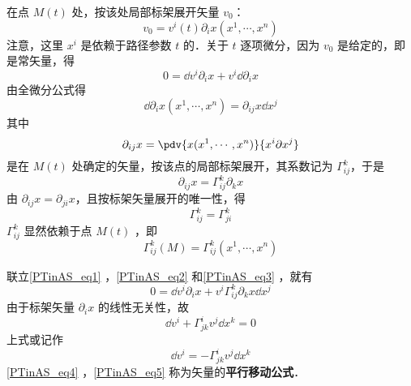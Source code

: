 在点 $M(t)$ 处，按该处局部标架展开矢量 $v_0$：
\begin{equation}
v_0=v^i(t)\partial_i x(x^1,\cdots,x^n)
\end{equation}
注意，这里 $x^i$ 是依赖于路径参数 $t$ 的．关于 $t$ 逐项微分，因为 $v_0$ 是给定的，即是常矢量，得
\begin{equation}\label{PTinAS_eq1}
0=\dd v^i\partial_i x+v^i\dd \partial_i x
\end{equation}
由全微分公式得
\begin{equation}\label{PTinAS_eq2}
\dd \partial_i x(x^1,\cdots,x^n)=\partial_{ij}x\dd x^j
\end{equation}
其中
\begin{equation}
\partial_{ij}x=\pdv{x(x^1,\cdots,x^n)}{x^i\partial x^j}
\end{equation}
是在 $M(t)$ 处确定的矢量，按该点的局部标架展开，其系数记为 $\Gamma^k_{ij}$，于是
\begin{equation}\label{PTinAS_eq3}
\partial_{ij}x=\Gamma^k_{ij}\partial_k x
\end{equation}
由 $\partial_{ij} x=\partial_{ji} x$，且按标架矢量展开的唯一性，得
\begin{equation}
\Gamma^k_{ij}=\Gamma^k_{ji}
\end{equation}
 $\Gamma^k_{ij}$ 显然依赖于点 $M(t)$ ，即
 \begin{equation}
 \Gamma^k_{ij}(M)=\Gamma^k_{ij}(x^1,\cdots,x^n)
 \end{equation}
 
联立\autoref{PTinAS_eq1} ，\autoref{PTinAS_eq2} 和\autoref{PTinAS_eq3} ，就有
\begin{equation}
0=\dd v^i\partial_i x+v^i\Gamma^k_{ij}\partial_k x\dd x^j
\end{equation}
由于标架矢量 $\partial_i x$ 的线性无关性，故
\begin{equation}\label{PTinAS_eq4}
\dd v^i+\Gamma^i_{jk}v^j\dd x^k=0
\end{equation}
上式或记作
\begin{equation}\label{PTinAS_eq5}
\dd v^i=-\Gamma^i_{jk}v^j\dd x^k
\end{equation}
\autoref{PTinAS_eq4} ，\autoref{PTinAS_eq5} 称为矢量的\textbf{平行移动公式}．